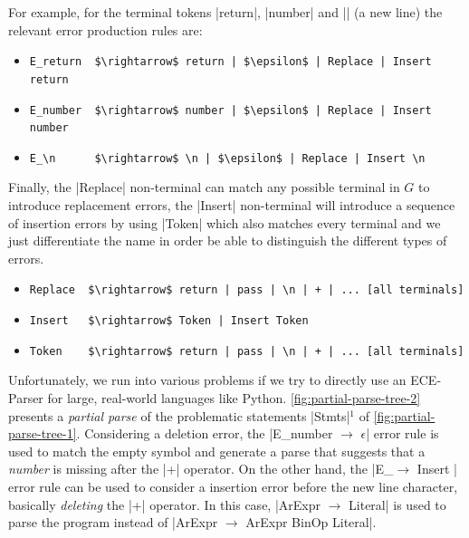 For example, for the terminal tokens |return|, |number| and |\n| (a new line)
the relevant error production rules are:
\begin{itemize}
  \item \lstinline{E_return  $\rightarrow$ return | $\epsilon$ | Replace | Insert return}
  \item \lstinline{E_number  $\rightarrow$ number | $\epsilon$ | Replace | Insert number}
  \item \lstinline{E_\n      $\rightarrow$ \n | $\epsilon$ | Replace | Insert \n}
\end{itemize}
Finally, the |Replace| non-terminal can match any possible terminal in $G$ to
introduce replacement errors, the |Insert| non-terminal will introduce a
sequence of insertion errors by using |Token| which also matches every terminal
and we just differentiate the name in order be able to distinguish the different
types of errors.
\begin{itemize}
  \item \lstinline{Replace  $\rightarrow$ return | pass | \n | + | ... [all terminals]}
  \item \lstinline{Insert   $\rightarrow$ Token | Insert Token}
  \item \lstinline{Token    $\rightarrow$ return | pass | \n | + | ... [all terminals]}
\end{itemize}







%
Unfortunately, we run into various problems if we
try to directly use an ECE-Parser for large, real-world
languages like Python.
%
\autoref{fig:partial-parse-tree-2} presents a \emph{partial
parse} of the problematic statements |Stmts|$^1$ of
\autoref{fig:partial-parse-tree-1}.
%
Considering a deletion error, the
%
|E_number $\rightarrow$ $\epsilon$| error rule is used to match the empty symbol
and generate a parse that suggests that a \emph{number} is missing after the |+|
operator. On the other hand, the
%
|E_\n $\rightarrow$ Insert \n| error rule can be used to consider a insertion
error before the new line character, basically \emph{deleting} the |+| operator.
In this case, |ArExpr $\rightarrow$ Literal| is used to parse the program
instead of |ArExpr $\rightarrow$ ArExpr BinOp Literal|.


